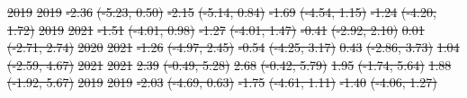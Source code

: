 \documentclass[
  letterpaper,
  DIV=11,
  numbers=noendperiod]{scrartcl}
\providecommand{\DIFdel}[1]{{\protect\color{red}\sout{#1}}}                      %
\providecommand{\DIFdelFL}[1]{\DIFdel{#1}} %
\begin{document}
\DIFdelFL{\hspace{1em}2019 }%
\DIFdelFL{2019 }%
\DIFdelFL{-2.36 }%
\DIFdelFL{(-5.23, 0.50) }%
\DIFdelFL{-2.15 }%
\DIFdelFL{(-5.14, 0.84) }%
\DIFdelFL{-1.69 }%
\DIFdelFL{(-4.54, 1.15) }%
\DIFdelFL{-1.24 }%
\DIFdelFL{(-4.20, 1.72)}%
\DIFdelFL{\hspace{1em}2019 }%
\DIFdelFL{2021 }%
\DIFdelFL{-1.51 }%
\DIFdelFL{(-4.01, 0.98) }%
\DIFdelFL{-1.27 }%
\DIFdelFL{(-4.01, 1.47) }%
\DIFdelFL{-0.41 }%
\DIFdelFL{(-2.92, 2.10) }%
\DIFdelFL{0.01 }%
\DIFdelFL{(-2.71, 2.74)}%
\DIFdelFL{\hspace{1em}2020 }%
\DIFdelFL{2021 }%
\DIFdelFL{-1.26 }%
\DIFdelFL{(-4.97, 2.45) }%
\DIFdelFL{-0.54 }%
\DIFdelFL{(-4.25, 3.17) }%
\DIFdelFL{0.43 }%
\DIFdelFL{(-2.86, 3.73) }%
\DIFdelFL{1.04 }%
\DIFdelFL{(-2.59, 4.67)}%
\DIFdelFL{\hspace{1em}2021 }%
\DIFdelFL{2021 }%
\DIFdelFL{2.39 }%
\DIFdelFL{(-0.49, 5.28) }%
\DIFdelFL{2.68 }%
\DIFdelFL{(-0.42, 5.79) }%
\DIFdelFL{1.95 }%
\DIFdelFL{(-1.74, 5.64) }%
\DIFdelFL{1.88 }%
\DIFdelFL{(-1.92, 5.67)}%
\DIFdelFL{\hspace{1em}2019 }%
\DIFdelFL{2019 }%
\DIFdelFL{-2.03 }%
\DIFdelFL{(-4.69, 0.63) }%
\DIFdelFL{-1.75 }%
\DIFdelFL{(-4.61, 1.11) }%
\DIFdelFL{-1.40 }%
\DIFdelFL{(-4.06, 1.27) }%
\end{document}
